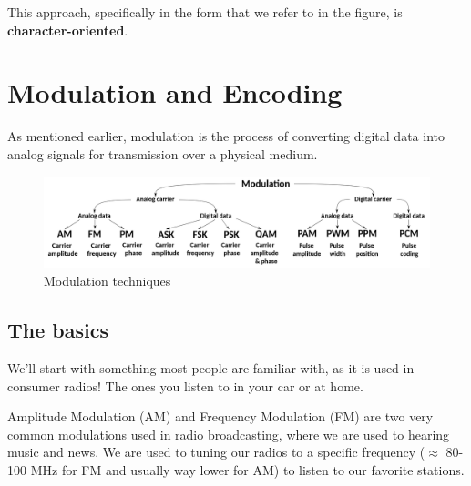 This approach, specifically in the form that we refer to in the figure, is \textbf{character-oriented}.
\vfill
\section{Modulation and Encoding}\label{sec:modulation}
As mentioned earlier, modulation is the process of converting digital data into analog signals for transmission over a physical medium.

\begin{figure}[h]
    \centering
    \includegraphics[width=\textwidth]{assets/osi/physical/signals/modulation.png}
    \caption{Modulation techniques}\label{fig:modulation_techniques}
\end{figure}

\subsection{The basics}
We'll start with something most people are familiar with, as it is used in consumer radios! The ones you listen to in your car or at home.

Amplitude Modulation (AM) and Frequency Modulation (FM) are two very common modulations used in radio broadcasting, where we are used to hearing music and news. We are used to tuning our radios to a specific frequency ($\approx$ 80-100 MHz for FM and usually way lower for AM) to listen to our favorite stations.

